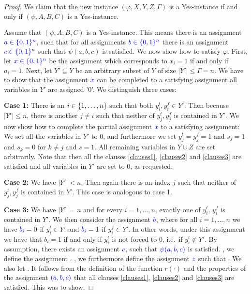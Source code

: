 \begin{proof}
We claim that the new instance $(\varphi,X,Y,Z, \Gamma)$ is a Yes-instance if and only if $(\psi,A,B,C)$ is a Yes-instance.

Assume that $(\psi,A,B,C)$ is a Yes-instance. This means there is an assignment $\textcolor{blue}{a \in \{ 0,1 \}^n}$, such that for all assignments $\textcolor{blue}{b \in \{ 0,1 \}^n}$ there is an assignment $\textcolor{blue}{c \in \{ 0,1 \}}^n$ such that $\psi(a,b,c)$ is satisfied. 
We now show how to satisfy $\varphi$. 
First, let $\textcolor{blue}{x \in \{ 0,1 \}^n}$ be the assignment which corresponds to  $x_i=1$ if and only if $a_i=1$. 
Next, let $Y' \subseteq Y$ be an arbitrary subset of $Y$ of size $|Y'| \leq \Gamma = n$. 
We have to show that the assignment $\textcolor{blue}{x}$ can be completed to a satisfying assignment  all variables in $Y'$ are assigned '0'.  We distinguish three cases:

\textbf{Case 1:} There is an $i \in \{ 1, \ldots, n \}$ such that both $y_i^t,y_i^f \in Y'$: Then because $|Y'| \leq n$, there is another $j \neq i$ such that neither of $y^t_j, y^f_j$ is contained in $Y'$. 
We now show how to complete the partial assignment $\textcolor{blue}{x}$ to a satisfying assignment: We set all the variables in $Y'$ to 0, and furthermore we set $y^t_j=y^f_j=1$ and $s_j=1$ and $s_k=0$ for $k \neq j$ and $s=1$. 
All remaining variables in $Y \cup Z$ are set arbitrarily. Note that then all the clauses \eqref{clauses1}, \eqref{clauses2} and \eqref{clauses3} are satisfied and all variables in $Y'$ are set to 0, as requested.

\textbf{Case 2:} We have $|Y'| < n$. Then again there is an index $j$ such that neither of $y^t_j, y^f_j$ is contained in $Y'$. This case is analogous to case 1.

\textbf{Case 3:} We have $|Y'| = n$ and for every $i=1,\dots,n$, exactly one of $y_i^t$, $y^f_i$ is contained in $Y'$. 
We then consider the assignment $\textcolor{blue}{b}$, where for all $i=1,\dots,n$ we have $\textcolor{blue}{b_i} = 0$ if $y_i^t \in Y'$ and $\textcolor{blue}{b_i} = 1$ if $y_i^f \in Y'$. 
In other words, under this assignment we have that $b_i = 1$ if and only if $y^t_i$ is not forced to 0, i.e.\ if $y^t_i \not\in Y'$. 
By assumption, there exists an assignment $\textcolor{blue}{c}$, such that $\textcolor{blue}{\psi(a,b,c)}$ is satisfied. 
, we define the assignment . 
, we furthermore define the assignment $\textcolor{blue}{z}$ such that . 
We also let . 
It follows from the definition of the function $r(\cdot)$ and the properties of the assignment $\textcolor{blue}{(a,b,c)}$ that all clauses \eqref{clauses1}, \eqref{clauses2} and \eqref{clauses3} are satisfied. This was to show.


\end{proof}
